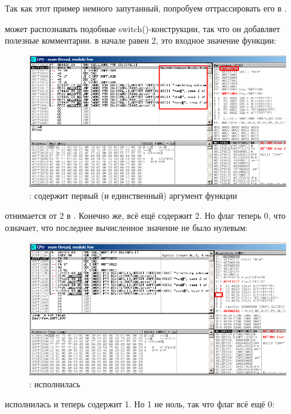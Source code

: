 ﻿\clearpage
\myparagraph{\olly}

Так как этот пример немного запутанный, попробуем оттрассировать его в \olly.

\olly может распознавать подобные switch()-конструкции, так что он добавляет полезные комментарии.
\EAX в начале равен 2, это входное значение функции: 

\begin{figure}[H]
\centering
\includegraphics[scale=\FigScale]{patterns/08_switch/1_few/olly1.png}
\caption{\olly: \EAX содержит первый (и единственный) аргумент функции}
\label{fig:switch_few_olly1}
\end{figure}

 отнимается от 2 в \EAX. 
Конечно же, \EAX всё ещё содержит 2.
Но флаг \ZF теперь 0, что означает, что последнее вычисленное значение не было нулевым:

\begin{figure}[H]
\centering
\includegraphics[scale=\FigScale]{patterns/08_switch/1_few/olly2.png}
\caption{\olly: \SUB исполнилась}
\label{fig:switch_few_olly2}
\end{figure}

\clearpage
\DEC исполнилась и \EAX теперь содержит 1. 
Но 1 не ноль, так что флаг \ZF всё ещё 0:

